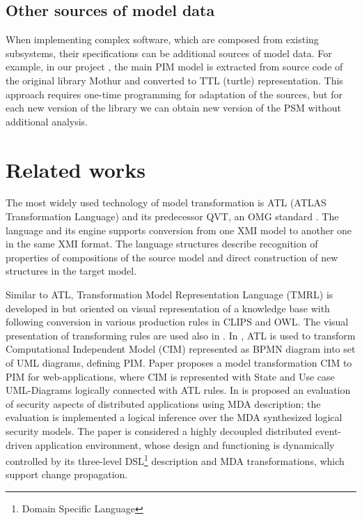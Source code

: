 \documentclass[conference]{IEEEtran}
\begin{document}

\subsection{Other sources of model data}
\label{sec:other-models}

When implementing complex software, which are composed from existing subsystems, their specifications can be additional sources of model data.  For example, in our project \cite{bit2019}, the main PIM model is extracted from source code of the original library Mothur and converted to TTL (turtle) representation.  This approach requires one-time programming for adaptation of the sources, but for each new version of the library we can obtain new version of the PSM without additional analysis.  %



\section{Related works}

The most widely used technology of model transformation is ATL (ATLAS Transformation Language) \cite{atl} and its predecessor QVT, an OMG standard \cite{QVT}.  The language and its engine supports conversion from one XMI model to another one in the same XMI format.  The language structures describe recognition of properties of compositions of the source model and direct construction of new structures in the target model.

Similar to ATL, Transformation Model Representation Language (TMRL) is developed in \cite{nikita} but oriented on visual representation of a knowledge base with following conversion in various production rules in CLIPS and OWL.  The visual presentation of transforming rules are used also in \cite{GT}.  In \cite{azis}, ATL is used to transform Computational Independent Model (CIM) represented as BPMN diagram into set of UML diagrams, defining PIM. Paper \cite{Rhazali} proposes a model transformation CIM to PIM for web-applications, where CIM is represented with State and Use case UML-Diagrams logically connected with ATL rules.  In \cite{Hamid} is proposed an evaluation of security aspects of distributed applications using MDA description; the evaluation is implemented a logical inference over the MDA synthesized logical security models. The paper \cite{Zdun} is considered a highly decoupled distributed event-driven application environment, whose design and functioning is dynamically controlled by its three-level DSL\footnote{Domain Specific Language} description and MDA transformations, which support change propagation.
\end{document}

